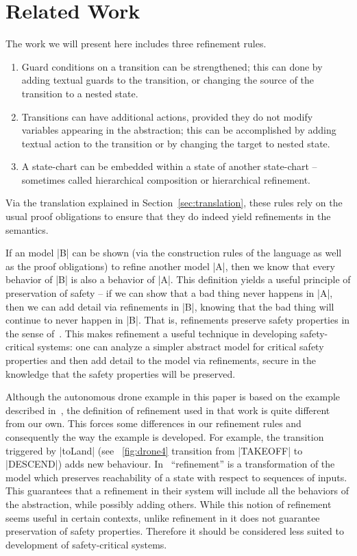 
\section{Related Work}
\label{sec:relatedWork}

The work we will present here includes three refinement rules.
\begin{enumerate}
\item Guard conditions on a transition can be strengthened; 
this can done by adding textual guards to the transition, or
changing the source of the transition to a nested state.
\item Transitions can have additional actions, provided they do not
  modify variables appearing in the abstraction; this can be 
  accomplished by adding textual action to the transition 
  or by changing the target to nested state.
\item A state-chart can be embedded within a state of another
  state-chart -- sometimes called hierarchical composition or
  hierarchical refinement.
\end{enumerate}
Via the translation explained in Section~\ref{sec:translation}, these rules
rely on the usual \EventB proof obligations to ensure that they do
indeed yield refinements in the \EventB semantics.

If an \EventB model |B| can be shown (via the construction rules of
the \EventB language as well as the proof obligations) to refine
another \EventB model |A|, then we know that every behavior of |B| is
also a behavior of |A|. This definition yields a useful principle of
preservation of safety -- if we can show that a bad thing never
happens in |A|, then we can add detail via refinements in |B|, knowing
that the bad thing will continue to never happen in |B|. That is,
\EventB refinements preserve safety properties in the sense
of~\cite{lamport1977proving}. This makes refinement a useful technique
in developing safety-critical systems: one can analyze a simpler
abstract model for critical safety properties and then add detail to
the model via refinements, secure in the knowledge that the safety
properties will be preserved.

Although the autonomous drone example in this paper is based on the
example described in~\cite{Syriani_2019}, the definition of refinement
used in that work is quite different from our own. This forces some
differences in our refinement rules and consequently the way the
example is developed. For example, the transition triggered by |toLand| 
(see ~\ref{fig:drone4} transition from |TAKEOFF| to |DESCEND|) 
adds new behaviour.
In~\cite{Syriani_2019} ``refinement'' is a
transformation of the model which preserves reachability of a state
with respect to sequences of inputs. This guarantees that a refinement
in their system will include all the behaviors of the abstraction,
while possibly adding others. While this notion of refinement seems
useful in certain contexts, unlike refinement in \EventB it does not
guarantee preservation of safety properties. Therefore it should be
considered less suited to development of safety-critical systems.

